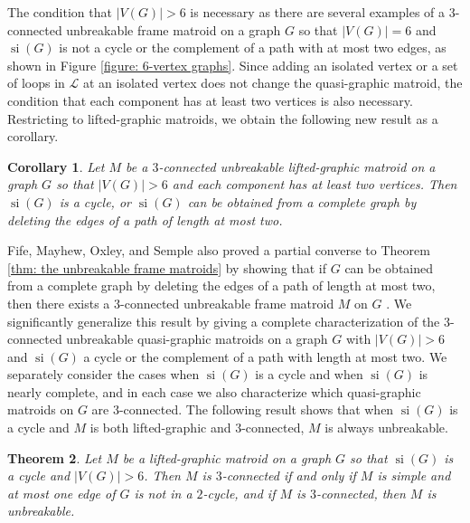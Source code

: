 \documentclass[12pt]{article}
\newtheorem{theorem}{Theorem}[section]
\newtheorem{corollary}[theorem]{Corollary}
\theoremstyle{definition}
\theoremstyle{plain} %
\newcommand{\cL}{\mathcal{L}}
\DeclareMathOperator{\si}{si}
\newcommand{\JD}[1]{{\color{red}(\text{JD:}
#1)}}
\begin{document}
The condition that $|V(G)| > 6$ is necessary as there are several examples of a $3$-connected unbreakable frame matroid on a graph $G$ so that $|V(G)| = 6$ and $\si(G)$ is not a cycle or the complement of a path with at most two edges, as shown in Figure \ref{figure: 6-vertex graphs}.
Since adding an isolated vertex or a set of loops in $\cL$ at an isolated vertex does not change the quasi-graphic matroid, the condition that each component has at least two vertices is also necessary. Restricting to lifted-graphic matroids, we obtain the following new result as a corollary.

\begin{corollary} \label{thm: main corollary for lifted-graphic matroids}
Let $M$ be a $3$-connected unbreakable lifted-graphic matroid on a graph $G$ so that $|V(G)| > 6$ and each component has at least two vertices.
Then $\si(G)$ is a cycle, or $\si(G)$ can be obtained from a complete graph by deleting the edges of a path of length at most two.    
\end{corollary}

Fife, Mayhew, Oxley, and Semple also proved a partial converse to Theorem \ref{thm: the unbreakable frame matroids} by showing that if $G$ can be obtained from a complete graph by deleting the edges of a path of length at most two, then there exists a $3$-connected unbreakable frame matroid $M$ on $G$ \cite[Theorem 1.5]{Fife-Mayhew-Oxley-Semple2020}.
We significantly generalize this result by giving a complete characterization of the $3$-connected unbreakable quasi-graphic matroids on a graph $G$ with $|V(G)| > 6$ and $\si(G)$ a cycle or the complement of a path with length at most two.
We separately consider the cases when $\si(G)$ is a cycle and when $\si(G)$ is nearly complete, and in each case we also characterize which quasi-graphic matroids on $G$ are $3$-connected.
The following result shows that when $\si(G)$ is a cycle and $M$ is both lifted-graphic and $3$-connected, $M$ is always unbreakable.



\begin{theorem} \label{thm: main converse for cycles}
Let $M$ be a lifted-graphic matroid on a graph $G$ so that $\si(G)$ is a cycle and $|V(G)| > 6$.
Then $M$ is $3$-connected if and only if $M$ is simple and at most one edge of $G$ is not in a $2$-cycle, and if $M$ is $3$-connected, then $M$ is unbreakable.
\end{theorem}
 
\end{document}
